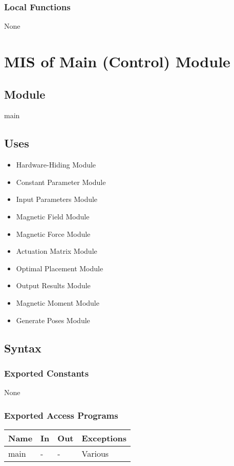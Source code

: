 \documentclass[12pt, titlepage]{article}
\begin{document}
\subsubsection{Local Functions}
None 
\newpage

\section{MIS of Main (Control) Module} \label{MISControl}

\subsection{Module}
main 

\subsection{Uses}
\begin{itemize}
  \item Hardware-Hiding Module 
  \item Constant Parameter Module 
  \item Input Parameters Module 
  \item Magnetic Field Module 
  \item Magnetic Force Module 
  \item Actuation Matrix Module 
  \item Optimal Placement Module 
  \item Output Results Module 
  \item Magnetic Moment Module 
  \item Generate Poses Module 
\end{itemize}

\subsection{Syntax}

\subsubsection{Exported Constants}
None 
\subsubsection{Exported Access Programs}
\begin{center}
\begin{tabular}{p{3cm} p{4cm} p{4cm} p{3cm}}
\hline
\textbf{Name} & \textbf{In} & \textbf{Out} & \textbf{Exceptions} \\
\hline
main & - & - & Various \\
\hline
\end{tabular}
\end{center}
\end{document}
